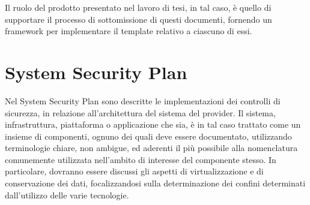 \documentclass[../main.tex]{subfiles}
\begin{document}
Il ruolo del prodotto presentato nel lavoro di tesi, in tal caso, è quello di supportare il processo di sottomissione di questi documenti, fornendo un framework per implementare il template relativo a ciascuno di essi.

\section{System Security Plan}

Nel System Security Plan sono descritte le implementazioni dei controlli di sicurezza, in relazione all'architettura del sistema del provider.
Il sistema, infrastruttura, piattaforma o applicazione che sia, è in tal caso trattato come un insieme di componenti, ognuno dei quali deve essere documentato, utilizzando terminologie chiare, non ambigue, ed aderenti il più possibile alla nomenclatura comunemente utilizzata nell'ambito di interesse del componente stesso.
In particolare, dovranno essere discussi gli aspetti di virtualizzazione e di conservazione dei dati, focalizzandosi sulla determinazione dei confini determinati dall'utilizzo delle varie tecnologie.
\end{document}
